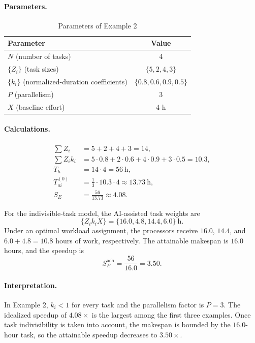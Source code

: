 
\paragraph{Parameters.}
\begin{table}[ht!]
\centering
\caption{Parameters of Example 2}
\label{tab:example-2-params}
\begin{tabular}{lc}
\toprule
Parameter & Value \\
\midrule
$N$ (number of tasks) & 4 \\
$\{Z_i\}$ (task sizes) & $\{5, 2, 4, 3\}$ \\
$\{k_i\}$ (normalized-duration coefficients) & $\{0.8, 0.6, 0.9, 0.5\}$ \\
$P$ (parallelism) & 3 \\
$X$ (baseline effort) & 4 h \\
\bottomrule
\end{tabular}
\end{table}

\paragraph{Calculations.}
\begin{align*}
  \sum Z_i &= 5 + 2 + 4 + 3 = 14, \\
  \sum Z_i k_i &= 5{\cdot}0.8 + 2{\cdot}0.6 + 4{\cdot}0.9 + 3{\cdot}0.5 = 10.3, \\
  T_h &= 14 \cdot 4 = 56~\text{h}, \\
  T_{ai}^{(0)} &= \frac{1}{3} \cdot 10.3 \cdot 4 \approx 13.73~\text{h}, \\
  S_E &= \frac{56}{13.73} \approx 4.08.
\end{align*}

For the indivisible-task model, the AI-assisted task weights are
\[
  \{Z_i k_i X\} = \{16.0, 4.8, 14.4, 6.0\}~\text{h}.
\]
Under an optimal workload assignment, the processors receive $16.0$, $14.4$,
and $6.0 + 4.8 = 10.8$ hours of work, respectively. The attainable makespan is
$16.0$ hours, and the speedup is
\[
  S_E^{\text{ach}} = \frac{56}{16.0} = 3.50.
\]

\paragraph{Interpretation.}
In Example 2, $k_i<1$ for every task and the parallelism factor is $P=3$. The
idealized speedup of $4.08\times$ is the largest among the first three
examples. Once task indivisibility is taken into account, the makespan is
bounded by the $16.0$-hour task, so the attainable speedup decreases to
$3.50\times$.

